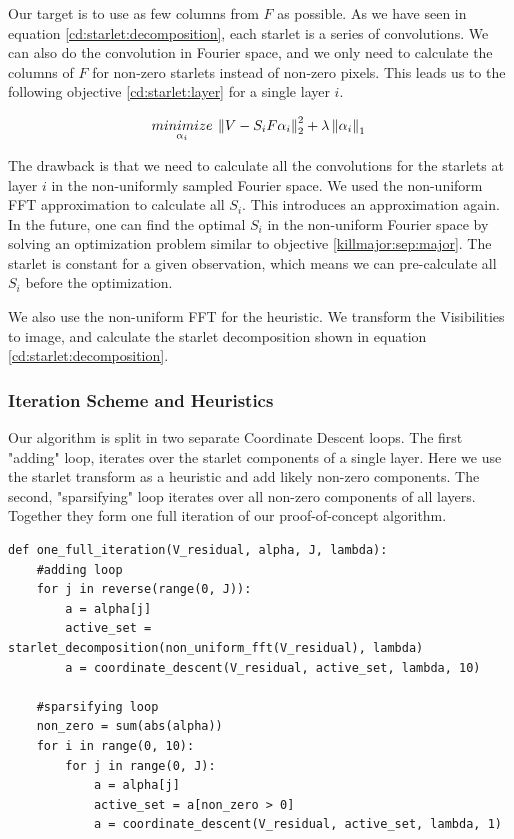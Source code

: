 Our target is to use as few columns from $F$ as possible. As we have seen in equation \eqref{cd:starlet:decomposition}, each starlet is a series of convolutions. We can also do the convolution in Fourier space, and we only need to calculate the columns of $F$ for non-zero starlets instead of non-zero pixels. This leads us to the following objective \eqref{cd:starlet:layer} for a single layer $i$.

\begin{equation}\label{cd:starlet:layer}
\underset{\alpha_i}{minimize} \: \left \| V - S_iF\alpha_i \right \|_2^2 + \lambda \left \| \alpha_i \right \|_1 \\
\end{equation}

The drawback is that we need to calculate all the convolutions for the starlets at layer $i$ in the non-uniformly sampled Fourier space. We used the non-uniform FFT approximation to calculate all $S_i$. This introduces an approximation again. In the future, one can find the optimal $S_i$ in the non-uniform Fourier space by solving an optimization problem similar to objective \eqref{killmajor:sep:major}. The starlet is constant for a given observation, which means we can pre-calculate all $S_i$ before the optimization. 

We also use the non-uniform FFT for the heuristic. We transform the Visibilities to image, and calculate the starlet decomposition shown in equation \eqref{cd:starlet:decomposition}. 


\subsubsection{Iteration Scheme and Heuristics}
Our algorithm is split in two separate Coordinate Descent loops. The first "adding" loop, iterates over the starlet components of a single layer. Here  we use the starlet transform as a heuristic and add likely non-zero components. The second, "sparsifying" loop iterates over all non-zero components of all layers. Together they form one full iteration of our proof-of-concept algorithm.
\begin{lstlisting} 
def one_full_iteration(V_residual, alpha, J, lambda):
	#adding loop
	for j in reverse(range(0, J)):
		a = alpha[j]
		active_set = starlet_decomposition(non_uniform_fft(V_residual), lambda)
		a = coordinate_descent(V_residual, active_set, lambda, 10)
		
	#sparsifying loop
	non_zero = sum(abs(alpha))
	for i in range(0, 10):
		for j in range(0, J):
			a = alpha[j]
			active_set = a[non_zero > 0]
			a = coordinate_descent(V_residual, active_set, lambda, 1)
\end{lstlisting}\label{cd:full}

